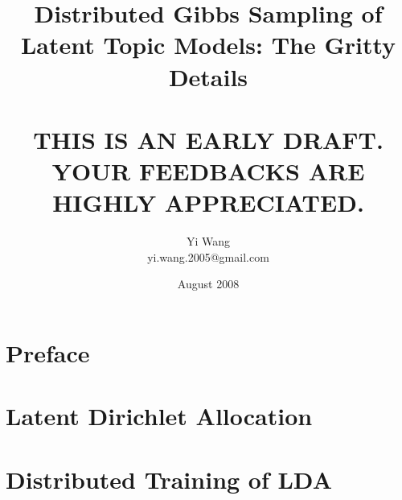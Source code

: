 \documentclass[a4paper,12pt]{report}
\title{Distributed Gibbs Sampling of Latent Topic Models: The Gritty
  Details\\ \mbox{} \\THIS IS AN EARLY DRAFT.  YOUR FEEDBACKS ARE
  HIGHLY APPRECIATED.}
\author{Yi Wang\\yi.wang.2005@gmail.com}
\date{August 2008}
\begin{document}
\maketitle

\newpage
\tableofcontents

\chapter{Preface}


\chapter{Latent Dirichlet Allocation}


\chapter{Distributed Training of LDA}





\end{document}
